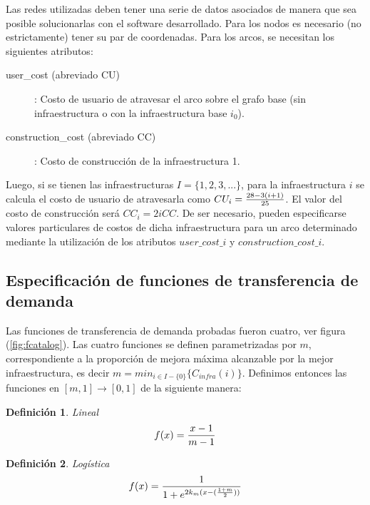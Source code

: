 \documentclass{article}
\newtheorem{definition}{Definición}
\begin{document}
  Las redes utilizadas deben tener una serie de datos asociados de manera que sea posible solucionarlas con el software desarrollado. Para los nodos es necesario (no estrictamente) tener su par de coordenadas. Para los arcos, se necesitan los siguientes atributos:

  \begin{description}
    \item[user\_cost (abreviado CU)]: Costo de usuario de atravesar el arco sobre el grafo base (sin infraestructura o con la infraestructura base $i_0$).
    \item[construction\_cost (abreviado CC)]: Costo de construcción de la infraestructura 1.
  \end{description}

  Luego, si se tienen las infraestructuras $I = \{1, 2, 3, ... \}$, para la infraestructura $i$ se calcula el costo de usuario de atravesarla como $CU_i = {28 - 3 (i + 1) \over 25}$. El valor del costo de construcción será $CC_i = 2i CC$. De ser necesario, pueden especificarse valores particulares de costos de dicha infraestructura para un arco determinado mediante la utilización de los atributos $user\_cost\_i$ y $construction\_cost\_i$.

  \subsection{Especificación de funciones de transferencia de demanda}

  Las funciones de transferencia de demanda probadas fueron cuatro, ver figura (\ref{fig:fcatalog}). Las cuatro funciones se definen parametrizadas por $m$, correspondiente a la proporción de mejora máxima alcanzable por la mejor infraestructura, es decir $m = min_{i \in I - \{0\}} \{ C_{infra}(i) \}$. Definimos entonces las funciones en $[m, 1] \rightarrow [0, 1]$ de la siguiente manera:

  \begin{definition}
    Lineal
    \begin{align}
        f(x) = {x -1 \over m - 1}
    \end{align}
  \end{definition}

  \begin{definition}
    Logística
    \begin{align}
        f(x) = {1 \over 1 + e^{2k_m(x - ({1 + m \over 2}))}}
    \end{align}
  \end{definition}
\end{document}
